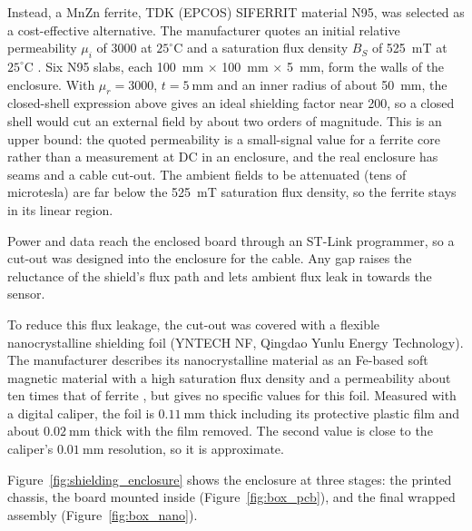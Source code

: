 \documentclass[12pt,a4paper]{article}
\begin{document}
Instead, a MnZn ferrite, TDK (EPCOS) SIFERRIT material N95, was selected as a cost-effective alternative. The manufacturer quotes an initial relative permeability $\mu_i$ of 3000 at $25^{\circ}\text{C}$ and a saturation flux density $B_S$ of \SI{525}{\milli\tesla} at $25^{\circ}\text{C}$ \cite{tdk_n95}. Six N95 slabs, each \SI{100}{\milli\metre} $\times$ \SI{100}{\milli\metre} $\times$ \SI{5}{\milli\metre}, form the walls of the enclosure. With $\mu_r = 3000$, $t = \SI{5}{\milli\metre}$ and an inner radius of about \SI{50}{\milli\metre}, the closed-shell expression above gives an ideal shielding factor near 200, so a closed shell would cut an external field by about two orders of magnitude. This is an upper bound: the quoted permeability is a small-signal value for a ferrite core rather than a measurement at DC in an enclosure, and the real enclosure has seams and a cable cut-out. The ambient fields to be attenuated (tens of microtesla) are far below the \SI{525}{\milli\tesla} saturation flux density, so the ferrite stays in its linear region.

Power and data reach the enclosed board through an ST-Link programmer, so a cut-out was designed into the enclosure for the cable. Any gap raises the reluctance of the shield's flux path and lets ambient flux leak in towards the sensor.

To reduce this flux leakage, the cut-out was covered with a flexible nanocrystalline shielding foil (YNTECH NF, Qingdao Yunlu Energy Technology). The manufacturer describes its nanocrystalline material as an Fe-based soft magnetic material with a high saturation flux density and a permeability about ten times that of ferrite \cite{yunlu_nanocrystalline}, but gives no specific values for this foil. Measured with a digital caliper, the foil is $\SI{0.11}{\milli\metre}$ thick including its protective plastic film and about $\SI{0.02}{\milli\metre}$ thick with the film removed. The second value is close to the caliper's $\SI{0.01}{\milli\metre}$ resolution, so it is approximate.

Figure~\ref{fig:shielding_enclosure} shows the enclosure at three stages: the printed chassis, the board mounted inside (Figure~\ref{fig:box_pcb}), and the final wrapped assembly (Figure~\ref{fig:box_nano}).
\end{document}
